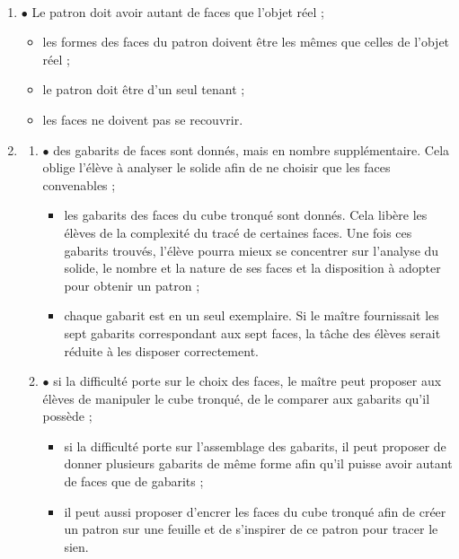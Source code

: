 \begin{corrige}
\ \\ [-5mm]
\begin{enumerate}
   \item \textcolor{A2}{$\bullet$} Le patron doit avoir autant de faces que l’objet réel ;
   \begin{itemize}
      \item les formes des faces du patron doivent être les mêmes que celles de l’objet réel ;
      \item le patron doit être d'un seul tenant ;
      \item les faces ne doivent pas se recouvrir. \\
   \end{itemize}
   \item
   \begin{enumerate}
      \item \textcolor{A2}{$\bullet$} des gabarits de faces sont donnés, mais en nombre supplémentaire. Cela oblige l'élève à analyser le solide afin de ne choisir que les faces convenables ;
      \begin{itemize}
         \item les gabarits des faces du cube tronqué sont donnés. Cela libère les élèves de la complexité du tracé de certaines faces. Une fois ces gabarits trouvés, l'élève pourra mieux se concentrer sur l’analyse du solide, le nombre et la nature de ses faces et la disposition à adopter pour obtenir un patron ;
         \item chaque gabarit est en un seul exemplaire. Si le maître fournissait les sept gabarits correspondant aux sept faces, la tâche des élèves serait réduite à les disposer correctement. \\
      \end{itemize}
      \item \textcolor{A2}{$\bullet$} si la difficulté porte sur le choix des faces, le maître peut proposer aux élèves de manipuler le cube tronqué, de le comparer aux gabarits qu'il possède ;
      \begin{itemize}
         \item si la difficulté porte sur l'assemblage des gabarits, il peut proposer de donner plusieurs gabarits de même forme afin qu'il puisse avoir autant de faces que de gabarits ;
         \item il peut aussi proposer d'encrer les faces du cube tronqué afin de créer un patron sur une feuille et de s'inspirer de ce patron pour tracer le sien. \\

\end{itemize}
\end{enumerate}
\end{enumerate}
\end{corrige}

